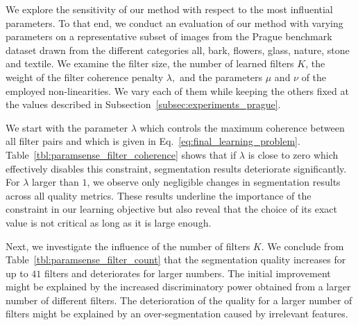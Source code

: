 \documentclass[journal]{IEEEtran}
\begin{document}
We explore the sensitivity of our method with respect to the most influential parameters. 
To that end, we conduct an evaluation of our method with varying parameters on a representative subset of images from the Prague benchmark dataset drawn from the different categories all, bark, flowers, glass, nature, stone and textile.
We examine the filter size, the number of learned filters $K$, the weight of the filter coherence penalty $\lambda,$ and the parameters $\mu$ and $\nu$ of the employed non-linearities. We vary each of them while keeping the others fixed at the values described in Subsection~\ref{subsec:experiments_prague}.

We start with the parameter $\lambda$ which controls the maximum coherence between all filter pairs and which is given in Eq.~\eqref{eq:final_learning_problem}.
Table~\ref{tbl:paramsense_filter_coherence} shows that if $\lambda$ is close to zero which effectively disables this constraint, segmentation results deteriorate significantly. For $\lambda$ larger than $1$, we observe only negligible changes in segmentation results across all quality metrics. These results underline the importance of the constraint in our learning objective but also reveal that the choice of its exact value is not critical as long as it is large enough.

Next, we investigate the influence of the number of filters $K$.
We conclude from Table~\ref{tbl:paramsense_filter_count} that the segmentation quality increases for up to $41$ filters and deteriorates for larger numbers. The initial improvement might be explained by the increased discriminatory power obtained from a larger number of different filters.
The deterioration of the quality for a larger number of filters might be explained by an over-segmentation caused by irrelevant features.
\end{document}
